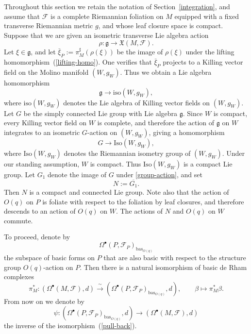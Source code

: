 \documentclass[reqno, 11pt]{amsart}
\theoremstyle{definition}
\theoremstyle{property}
\theoremstyle{remark}
\numberwithin{equation}{section}
\begin{document}
Throughout this section we retain the notation of
Section~\ref{integration}, and assume that $\mathcal{F}$ is a complete
Riemannian foliation on $M$ equipped with a fixed transverse Riemannian
metric $g$, and whose leaf closure space is compact.
 Suppose that we
are given an isometric transverse Lie algebra action
\[
\rho:\mathfrak{g}\to \mathfrak{X}(M,\mathcal{F}).
\]
Let $\xi\in \mathfrak{g}$, and let  $\bar{\xi}_P:=\pi_M^\sharp(\rho(\xi))$ be the image of $\rho(\xi)$ under the lifting homomorphism~(\ref{lifting-homo}). 
One verifies that $\bar{\xi}_P$ projects to a Killing vector field on the Molino manifold
$(W, g_W)$. Thus we obtain
a Lie algebra homomorphism
\[
\mathfrak{g}\to \mathrm{iso}(W,g_W),
\]
where $\mathrm{iso}(W,g_W)$ denotes the Lie algebra of Killing vector fields on
$(W,g_W)$. Let $G$ be the simply connected Lie group with Lie algebra
$\mathfrak{g}$. Since $W$ is compact, every Killing vector field on $W$ is
complete, and therefore the action of $\mathfrak{g}$ on $W$ integrates to an
isometric $G$-action on $(W,g_W)$, giving a homomorphism
\begin{equation}\label{group-action}
G\to \mathrm{Iso}(W,g_W),
\end{equation}
where $\mathrm{Iso}(W,g_W)$ denotes the Riemannian isometry group of $(W,g_W)$. Under our standing assumption, $W$
is compact. Thus $\mathrm{Iso}(W,g_W)$ is a compact Lie group. Let $G_1$ denote the
image of $G$ under \eqref{group-action}, and set
\begin{equation}\label{compact-gp}
N:=\overline{G_1}.
\end{equation}
Then $N$ is a compact and connected Lie group. Note also that the action of $O(q)$ on $P$ is foliate with
respect to the foliation by leaf closures, and therefore descends to an action
of $O(q)$ on $W$. The actions of $N$ and $O(q)$ on $W$ commute.

To proceed, denote by
\[
\Omega^\bullet(P,\mathcal{F}_P)_{\mathrm{bas}_{O(q)}}
\]
the subspace of basic forms on $P$ that are also basic with respect to the
structure group $O(q)$-action on $P$. Then there is a natural isomorphism of
basic de Rham complexes
\begin{equation}\label{pull-back}
\pi_M^*:
(\Omega^\bullet(M,\mathcal{F}),d)\xrightarrow{\;\sim\;}
(\Omega^\bullet(P,\mathcal{F}_P)_{\mathrm{bas}_{O(q)}},d),
\qquad
\beta\mapsto \pi_M^*\beta.
\end{equation}
From now on we denote by
\begin{equation}\label{canonical-iso}
\psi:
(\Omega^\bullet(P,\mathcal{F}_P)_{\mathrm{bas}_{O(q)}},d)
\to
(\Omega^\bullet(M,\mathcal{F}),d)
\end{equation}
the inverse of the isomorphism~(\ref{pull-back}).
\end{document}

